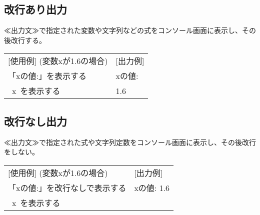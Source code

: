\documentclass[11pt,a4j]{jarticle}
\begin{document}
\subsection{改行あり出力}
\begin{quotation}
\end{quotation}
≪出力文≫で指定された変数や文字列などの式をコンソール画面に表示し、その後改行する。
\begin{table}[!h]
\hspace{1cm}
\begin{tabular}{l l}
[使用例] (変数xが1.6の場合) & \hspace{2cm} [出力例] \\
\hspace{1cm} \noindent 「xの値:」を表示する &
\hspace{3cm} \noindent xの値: \\
\hspace{1cm} \ x\ を表示する &
\hspace{3cm} 1.6\\
\end{tabular}
\end{table}

\vspace{-6mm}
\subsection{改行なし出力}
\begin{quotation}
\end{quotation}
≪出力文≫で指定された式や文字列定数をコンソール画面に表示し、その後改行をしない。
\begin{table}[!h]
\hspace{1cm}
\begin{tabular}{l l}
[使用例] (変数xが1.6の場合) & \hspace{2cm} [出力例] \\
\hspace{1cm} \noindent 「xの値:」を改行なしで表示する &
\hspace{3cm} \noindent xの値: 1.6\\
\hspace{1cm} \ x\ を表示する &
\hspace{3cm} \\
\end{tabular}
\end{table}
\end{document}
